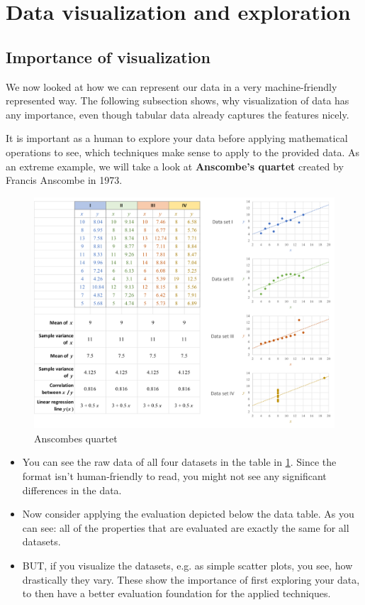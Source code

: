 \section{Data visualization and exploration}
\setcounter{figure}{0}



\subsection*{Importance of visualization}
We now looked at how we can represent our data in a very machine-friendly represented way. The following subsection shows, why visualization of data has any importance, even though tabular data already captures the features nicely.

It is important as a human to explore your data before applying mathematical operations to see, which techniques make sense to apply to the provided data. As an extreme example, we will take a look at \textbf{Anscombe's quartet} created by Francis Anscombe in 1973. 

\begin{figure}[h]
  \centering
  \includegraphics[width=\textwidth]{assets/visualization_and_extraction/anscombes_quartet.png}
  \caption{Anscombes quartet}
  \label{fig:2_anscombes_quartet}
\end{figure}

\begin{itemize}
  \item You can see the raw data of all four datasets in the table in \ref{fig:2_anscombes_quartet}. Since the format isn't human-friendly to read, you might not see any significant differences in the data.
  \item Now consider applying the evaluation depicted below the data table. As you can see: all of the properties that are evaluated are exactly the same for all datasets.
  \item BUT, if you visualize the datasets, e.g. as simple scatter plots, you see, how drastically they vary. These show the importance of first exploring your data, to then have a better evaluation foundation for the applied techniques.
\end{itemize} 


